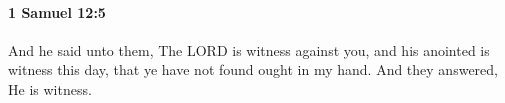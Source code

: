 
		\paragraph{1 Samuel 12:5} %
			\label{1SAMUEL-12-5}

			And he said unto them, The LORD is witness against you, and his anointed is witness this day, that ye have not found ought in my hand. And they answered, He is witness.


